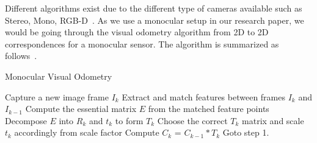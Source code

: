 Different algorithms exist due to the different type of cameras available such as Stereo, Mono, RGB-D~\cite{fraundorfer2012visual,scaramuzza2011visual}. As we use a monocular setup in our research paper, we would be going through the visual odometry algorithm from 2D to 2D correspondences for a monocular sensor. The algorithm is summarized as follows~\cite{scaramuzza2011visual}.

\begin{algorithm}[H]
    \caption{Monocular Visual Odometry}
	\begin{algorithmic}[1]
		\STATE Capture a new image frame $I_k$
    	\STATE Extract and match features between frames $I_k$ and $I_{k-1}$
    	\STATE Compute the essential matrix $E$ from the matched feature points
    	\STATE Decompose $E$ into $R_k$ and $t_k$ to form $T_k$
    	\STATE Choose the correct $T_k$ matrix and scale $t_k$ accordingly from scale factor
    	\STATE Compute $C_k$ = $C_{k-1}*T_k$
    	\STATE Goto step 1.
	\end{algorithmic}
\end{algorithm}

